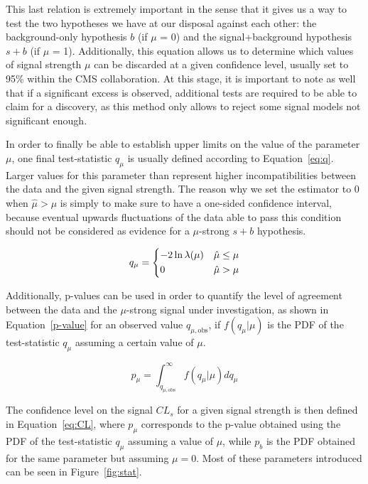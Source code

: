 \documentclass[a4paper, 10pt, openright]{report}
\begin{document}
This last relation is extremely important in the sense that it gives us a way to test the two hypotheses we have at our disposal against each other: the background-only hypothesis $b$ (if $\mu$ = 0) and the signal+background hypothesis $s + b$ (if $\mu$ = 1). Additionally, this equation allows us to determine which values of signal strength $\mu$ can be discarded at a given confidence level, usually set to 95\% within the \ac{CMS} collaboration. At this stage, it is important to note as well that if a significant excess is observed, additional tests are required to be able to claim for a discovery, as this method only allows to reject some signal models not significant enough.

In order to finally be able to establish upper limits on the value of the parameter $\mu$, one final test-statistic $q_\mu$ is usually defined according to Equation~\ref{eq:q}. Larger values for this parameter than represent higher incompatibilities between the data and the given signal strength. The reason why we set the estimator to 0 when $\hat{\mu} > \mu$ is simply to make sure to have a one-sided confidence interval, because eventual upwards fluctuations of the data able to pass this condition should not be considered as evidence for a $\mu$-strong $s+b$ hypothesis.

\begin{equation}
\label{eq:q}
q_\mu = 
\begin{dcases}
-2 \ln \lambda(\mu) & \hat{\mu} \leq \mu \\
0 & \hat{\mu} > \mu
\end{dcases}
\end{equation}

Additionally, p-values can be used in order to quantify the level of agreement between the data and the $\mu$-strong signal under investigation, as shown in Equation~\ref{p-value} for an observed value $q_{\mu, \text{obs}}$, if $f(q_\mu|\mu)$ is the \ac{PDF} of the test-statistic $q_\mu$ assuming a certain value of $\mu$.

\begin{equation}
\label{p-value}
p_\mu = \int_{q_{\mu, \text{obs}}}^\infty f(q_\mu|\mu) dq_\mu 
\end{equation}

The confidence level on the signal $CL_s$ for a given signal strength is then defined in Equation~\ref{eq:CL}, where $p_\mu$ corresponds to the p-value obtained using the \ac{PDF} of the test-statistic $q_\mu$ assuming a value of $\mu$, while $p_b$ is the \ac{PDF} obtained for the same parameter but assuming $\mu = 0$. Most of these parameters introduced can be seen in Figure~\ref{fig:stat}.
\end{document}
